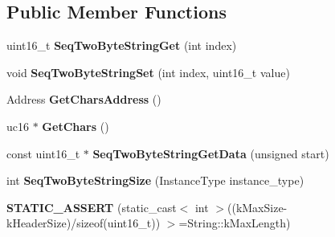 \subsection*{Public Member Functions}
\begin{DoxyCompactItemize}
\item 
uint16\+\_\+t {\bfseries Seq\+Two\+Byte\+String\+Get} (int index)\hypertarget{classv8_1_1internal_1_1_seq_two_byte_string_ac94caf8a368f8726b88a3a562e7956a6}{}\label{classv8_1_1internal_1_1_seq_two_byte_string_ac94caf8a368f8726b88a3a562e7956a6}

\item 
void {\bfseries Seq\+Two\+Byte\+String\+Set} (int index, uint16\+\_\+t value)\hypertarget{classv8_1_1internal_1_1_seq_two_byte_string_a2ac7928dd1839d6b8a5fb4a5c2d14d5f}{}\label{classv8_1_1internal_1_1_seq_two_byte_string_a2ac7928dd1839d6b8a5fb4a5c2d14d5f}

\item 
Address {\bfseries Get\+Chars\+Address} ()\hypertarget{classv8_1_1internal_1_1_seq_two_byte_string_a748c0415d4f6a7b880d1b9c94d058090}{}\label{classv8_1_1internal_1_1_seq_two_byte_string_a748c0415d4f6a7b880d1b9c94d058090}

\item 
uc16 $\ast$ {\bfseries Get\+Chars} ()\hypertarget{classv8_1_1internal_1_1_seq_two_byte_string_afa5cf73f5a9c7bbe9a45a07a35c22dff}{}\label{classv8_1_1internal_1_1_seq_two_byte_string_afa5cf73f5a9c7bbe9a45a07a35c22dff}

\item 
const uint16\+\_\+t $\ast$ {\bfseries Seq\+Two\+Byte\+String\+Get\+Data} (unsigned start)\hypertarget{classv8_1_1internal_1_1_seq_two_byte_string_a1e9587b8bd4ab86ec0dc7babaa2f21f8}{}\label{classv8_1_1internal_1_1_seq_two_byte_string_a1e9587b8bd4ab86ec0dc7babaa2f21f8}

\item 
int {\bfseries Seq\+Two\+Byte\+String\+Size} (Instance\+Type instance\+\_\+type)\hypertarget{classv8_1_1internal_1_1_seq_two_byte_string_ae3726273ad079d4bb0ec9d4d56fa9358}{}\label{classv8_1_1internal_1_1_seq_two_byte_string_ae3726273ad079d4bb0ec9d4d56fa9358}

\item 
{\bfseries S\+T\+A\+T\+I\+C\+\_\+\+A\+S\+S\+E\+RT} (static\+\_\+cast$<$ int $>$((k\+Max\+Size-\/k\+Header\+Size)/sizeof(uint16\+\_\+t)) $>$=String\+::k\+Max\+Length)\hypertarget{classv8_1_1internal_1_1_seq_two_byte_string_a7cc8c6f7692a23cbeb30626550e984ff}{}\label{classv8_1_1internal_1_1_seq_two_byte_string_a7cc8c6f7692a23cbeb30626550e984ff}

\end{DoxyCompactItemize}
